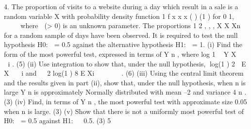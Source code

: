 

4. The proportion of visits to a website during a day which result in a sale is a random
variable X with probability density function
1
f x x x ( ) (1 ) for 0 1,  
    
where  (> 0) is an unknown parameter. The proportions
1 2 , , , X X Xn
for a
random sample of days have been observed. It is required to test the null hypothesis
H0:  = 0.5 against the alternative hypothesis H1:  = 1.
(i) Find the form of the most powerful test, expressed in terms of
Y
n
, where
log 1  Y X    i
.
(5)
(ii) Use integration to show that, under the null hypothesis,
log(1 ) 2  E X   i
and
 
2
log(1 ) 8 E Xi
     
.
(6)
(iii) Using the central limit theorem and the results given in part (ii), show that,
under the null hypothesis, when n is large
Y
n
is approximately Normally
distributed with mean –2 and variance
4
n
.
(3)
(iv) Find, in terms of
Y
n
, the most powerful test with approximate size 0.05 when n
is large.
(3)
(v) Show that there is not a uniformly most powerful test of H0:  = 0.5 against
H1:   0.5.
(3)
5
